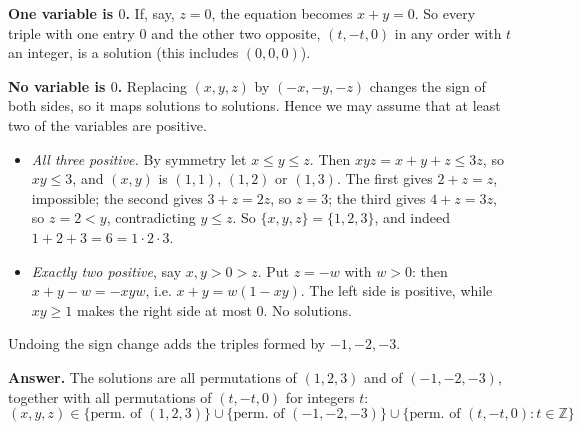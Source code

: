 \textbf{One variable is $0$.} If, say, $z=0$, the equation becomes $x+y=0$. So every triple with one entry $0$ and the other two opposite, $(t,-t,0)$ in any order with $t$ an integer, is a solution (this includes $(0,0,0)$).

\textbf{No variable is $0$.} Replacing $(x,y,z)$ by $(-x,-y,-z)$ changes the sign of both sides, so it maps solutions to solutions. Hence we may assume that at least two of the variables are positive.
\begin{itemize}
\item \emph{All three positive.} By symmetry let $x\le y\le z$. Then $xyz=x+y+z\le3z$, so $xy\le3$, and $(x,y)$ is $(1,1)$, $(1,2)$ or $(1,3)$. The first gives $2+z=z$, impossible; the second gives $3+z=2z$, so $z=3$; the third gives $4+z=3z$, so $z=2<y$, contradicting $y\le z$. So $\{x,y,z\}=\{1,2,3\}$, and indeed $1+2+3=6=1\cdot2\cdot3$.
\item \emph{Exactly two positive}, say $x,y>0>z$. Put $z=-w$ with $w>0$: then $x+y-w=-xyw$, i.e. $x+y=w(1-xy)$. The left side is positive, while $xy\ge1$ makes the right side at most $0$. No solutions.
\end{itemize}
Undoing the sign change adds the triples formed by $-1,-2,-3$.

\textbf{Answer.} The solutions are all permutations of $(1,2,3)$ and of $(-1,-2,-3)$, together with all permutations of $(t,-t,0)$ for integers $t$:
\[\boxed{(x,y,z)\in\{\text{perm. of }(1,2,3)\}\cup\{\text{perm. of }(-1,-2,-3)\}\cup\{\text{perm. of }(t,-t,0):t\in\mathbb{Z}\}}\]
